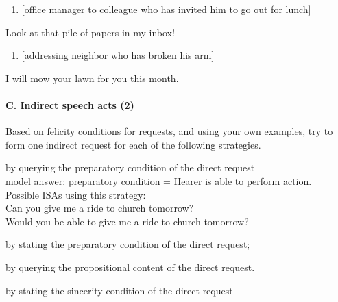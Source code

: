 \begin{enumerate}
\item 
\textrm{[office manager to colleague who has invited him to go out for lunch]}
\end{enumerate}
\rmfamily
Look at that pile of papers in my inbox!


\begin{enumerate}
\item 
\textrm{[addressing neighbor who has broken his arm]}
\end{enumerate}
\rmfamily
I will mow your lawn for you this month.


\paragraph{C. Indirect speech acts (2)}

Based on felicity conditions for requests, and using your own examples, try to form one indirect request for each of the following strategies.

\ea \label{ex:10.}
\ea \label{ex:10.} by querying the preparatory condition of the direct request\\
\textsf{model answer: preparatory condition = Hearer is able to perform action.\\
Possible ISAs using this strategy:\\
Can you give me a ride to church tomorrow?\\
Would you be able to give me a ride to church tomorrow?}

\ex by stating the preparatory condition of the direct request;

\ex by querying the propositional content of the direct request.

\ex by stating the sincerity condition of the direct request
\z
\z

